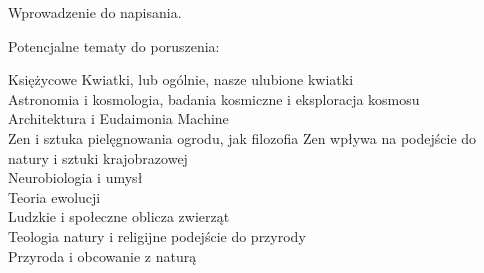Wprowadzenie do napisania.

\vin Potencjalne tematy do poruszenia: 

Księżycowe Kwiatki, lub ogólnie, nasze ulubione kwiatki \\
Astronomia i kosmologia, badania kosmiczne i eksploracja kosmosu \\
Architektura i Eudaimonia Machine \\
Zen i sztuka pielęgnowania ogrodu, jak filozofia Zen wpływa na podejście do natury i sztuki krajobrazowej \\
Neurobiologia i umysł \\
Teoria ewolucji \\
Ludzkie i społeczne oblicza zwierząt \\
Teologia natury i religijne podejście do przyrody \\
Przyroda i obcowanie z naturą

